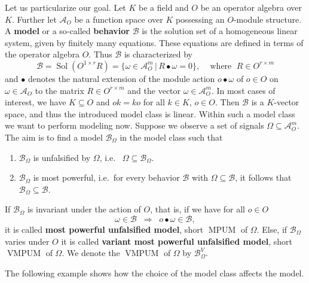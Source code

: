 \documentclass[a4paper,10pt]{article}
\theoremstyle{nonumberplain}
\DeclareMathOperator{\MPUM}{MPUM}
\DeclareMathOperator{\VMPUM}{VMPUM}
\DeclareMathOperator{\Sol}{Sol}
\begin{document}
Let us particularize our goal. 
Let $K$ be a field and $O$ be an operator algebra over $K$. Further 
let $\mathcal{A}_O$ be a function space over $K$ possessing an $O$-module structure.
A \textbf{model} or a so-called \textbf{behavior} $\mathcal{B}$ is the solution
set 
of a homogeneous linear system, given by finitely many equations. These equations are defined in terms of
the operator algebra $O$. Thus $\mathcal{B}$ is characterized by
$$ \mathcal{B}=\Sol(O^{1\times r}R)= \lbrace \omega \in \mathcal{A}_O^m \, | \, R \bullet \omega= 0 \rbrace, \;\;\; 
\mbox{ where } \; R\in O^{r \times m}$$
and $\bullet$ denotes the natural extension of the module action $o \bullet \omega$ of 
$o \in O$ on $\omega \in \mathcal{A}_O$ to the matrix $R \in O^{r \times m}$ and the vector
$\omega \in \mathcal{A}_O^m$.
In most cases of interest, we have $K\subseteq O$ and $o k = k o$ for all $k \in K$, $o \in O$.
Then $\mathcal{B}$ is a $K$-vector space, and thus the introduced model class is linear.
Within such a model class we want to perform modeling now. Suppose we observe a set of signals 
$\Omega \subseteq \mathcal{A}_O^m$. The aim is to find a model $\mathcal{B}_\Omega$ in the model class such that
\begin{enumerate}
 \item $\mathcal{B}_\Omega$ is unfalsified by $\Omega$, i.e. \ $\Omega \subseteq \mathcal{B}_\Omega$.
 \item $\mathcal{B}_\Omega$ is most powerful, i.e.\ for every behavior $\mathcal{B}$ with
$\Omega \subseteq \mathcal{B}$, it follows that $\mathcal{B}_\Omega \subseteq \mathcal{B}$.
\end{enumerate}
If $\mathcal{B}_\Omega$ is invariant under the action of $O$, that is,
if we have for all $o \in O$ 
$$ \omega \in \mathcal{B} \;\; \Rightarrow  \;\; o \bullet \omega \in \mathcal{B},$$ 
it is called \textbf{most powerful unfalsified model}, 
short $\MPUM$ of $\Omega$. Else, if $\mathcal{B}_\Omega$ varies under $O$ it is called 
\textbf{variant most powerful unfalsified model}, short $\VMPUM$ of $\Omega$. 
We denote the $\VMPUM$ of $\Omega$ by $\mathcal{B}_\Omega^V$.

The following example shows how the choice of the model class affects the model.
\end{document}
